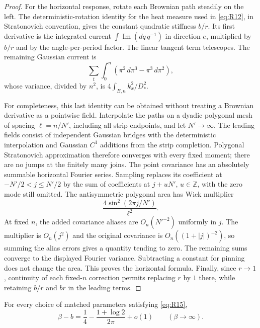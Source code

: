 \begin{proof}
For the horizontal response, rotate each Brownian path steadily on the
left. The deterministic-rotation identity for the heat measure used in
\eqref{eq:R12}, in Stratonovich convention, gives the constant quadratic
stiffness $b/r$. Its first derivative is the integrated current
$\int\operatorname{Im}(dq\,q^{-1})$ in direction $e$, multiplied by
$b/r$ and by the angle-per-period factor. The linear tangent term
telescopes. The remaining Gaussian current is
\[
 \sum_t\int_0^n(\pi^2\,d\pi^3-\pi^3\,d\pi^2),
\]
whose variance, divided by $n^2$, is
$4\int_{B,n}k_x^2/D_*^2$.

For completeness, this last identity can be obtained without treating a
Brownian derivative as a pointwise field. Interpolate the paths on a
dyadic polygonal mesh of spacing $\ell=n/N'$, including all strip
endpoints, and let $N'\to\infty$. The leading fields consist of
independent Gaussian bridges with the deterministic interpolation and
Gaussian $C^1$ additions from the strip completion. Polygonal
Stratonovich approximation therefore converges with every fixed moment;
there are no jumps at the finitely many joins. The point covariance has
an absolutely summable horizontal Fourier series. Sampling replaces its
coefficient at $-N'/2<j\le N'/2$ by the sum of coefficients at
$j+uN'$, $u\in\mathbb Z$, with the zero mode still omitted. The
antisymmetric polygonal area has Wick multiplier
\[
 \frac{4\sin^2(2\pi j/N')}{\ell^2}.
\]
At fixed $n$, the added covariance aliases are $O_n(N'^{-2})$ uniformly
in $j$. The multiplier is $O_n(j^2)$ and the original covariance is
$O_n((1+|j|)^{-2})$, so summing the alias errors gives a quantity tending
to zero. The remaining sums converge to the displayed Fourier variance.
Subtracting a constant for pinning does not change the area. This proves
the horizontal formula. Finally, since $r\to1$, continuity of each
fixed-$n$ correction permits replacing $r$ by $1$ there, while retaining
$b/r$ and $br$ in the leading terms.
\end{proof}

\begin{proposition}
\label{prop:matching-coupling-shift}
For every choice of matched parameters satisfying \eqref{eq:R15},
\begin{equation}
 \beta-b=\frac14-\frac{1+\log 2}{2\pi}+o(1)
 \qquad (\beta\to\infty).
 \label{eq:R21}
\end{equation}
\end{proposition}

